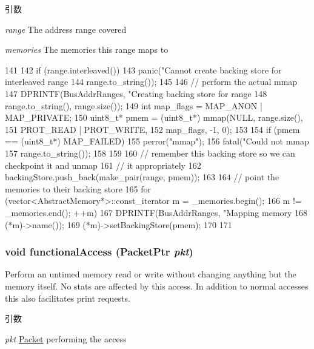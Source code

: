 \begin{DoxyParams}{引数}
\item[{\em range}]The address range covered \item[{\em memories}]The memories this range maps to \end{DoxyParams}



\begin{DoxyCode}
141 {
142     if (range.interleaved())
143         panic("Cannot create backing store for interleaved range %
144               range.to_string());
145 
146     // perform the actual mmap
147     DPRINTF(BusAddrRanges, "Creating backing store for range %
148             range.to_string(), range.size());
149     int map_flags = MAP_ANON | MAP_PRIVATE;
150     uint8_t* pmem = (uint8_t*) mmap(NULL, range.size(),
151                                     PROT_READ | PROT_WRITE,
152                                     map_flags, -1, 0);
153 
154     if (pmem == (uint8_t*) MAP_FAILED) {
155         perror("mmap");
156         fatal("Could not mmap %
157               range.to_string());
158     }
159 
160     // remember this backing store so we can checkpoint it and unmap
161     // it appropriately
162     backingStore.push_back(make_pair(range, pmem));
163 
164     // point the memories to their backing store
165     for (vector<AbstractMemory*>::const_iterator m = _memories.begin();
166          m != _memories.end(); ++m) {
167         DPRINTF(BusAddrRanges, "Mapping memory %
168                 (*m)->name());
169         (*m)->setBackingStore(pmem);
170     }
171 }
\end{DoxyCode}
\hypertarget{classPhysicalMemory_ace845b5316308e12fd958fa5df09a8e8}{
\subsubsection[{functionalAccess}]{\setlength{\rightskip}{0pt plus 5cm}void functionalAccess ({\bf PacketPtr} {\em pkt})}}
\label{classPhysicalMemory_ace845b5316308e12fd958fa5df09a8e8}
Perform an untimed memory read or write without changing anything but the memory itself. No stats are affected by this access. In addition to normal accesses this also facilitates print requests.


\begin{DoxyParams}{引数}
\item[{\em pkt}]\hyperlink{classPacket}{Packet} performing the access \end{DoxyParams}




